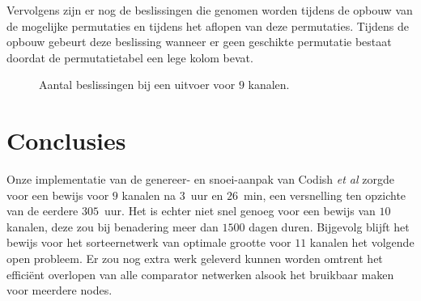 \documentclass{article}
\begin{document}
Vervolgens zijn er nog de beslissingen die genomen worden tijdens de opbouw van de mogelijke permutaties en tijdens het aflopen van deze permutaties.
Tijdens de opbouw gebeurt deze beslissing wanneer er geen geschikte permutatie bestaat doordat de permutatietabel een lege kolom bevat.

\begin{figure}[!h]
\centering
\caption{Aantal beslissingen bij een uitvoer voor $9$ kanalen.}
\label{AantalBeslissingen9Kanalen}
\end{figure}

\section{Conclusies}
Onze implementatie van de genereer- en snoei-aanpak van Codish \textit{et al} zorgde voor een bewijs voor $9$ kanalen na $3$~uur en $26$~min, een versnelling ten opzichte van de eerdere $305$~uur.
Het is echter niet snel genoeg voor een bewijs van $10$ kanalen, deze zou bij benadering meer dan $1500$ dagen duren.
Bijgevolg blijft het bewijs voor het sorteernetwerk van optimale grootte voor $11$ kanalen het volgende open probleem.
Er zou nog extra werk geleverd kunnen worden omtrent het effici\"ent overlopen van alle comparator netwerken alsook het bruikbaar maken voor meerdere nodes.
\end{document}
